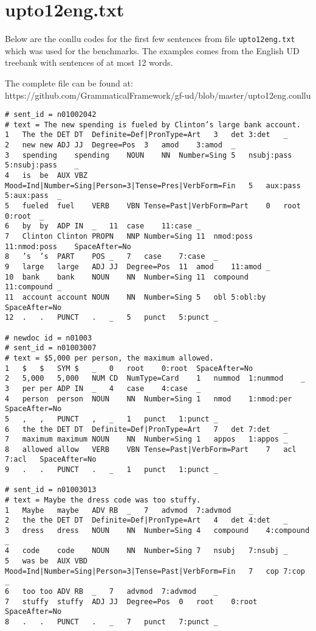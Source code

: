 \chapter{upto12eng.txt}\label{app:upto12}

Below are the conllu codes for the first few sentences from file \verb|upto12eng.txt| which was used for the benchmarks. The examples comes from the English UD treebank with sentences of at most 12 words.

The complete file can be found at: https://github.com/GrammaticalFramework/gf-ud/blob/master/upto12eng.conllu

\begin{verbatim}
# sent_id = n01002042
# text = The new spending is fueled by Clinton’s large bank account.
1	The	the	DET	DT	Definite=Def|PronType=Art	3	det	3:det	_
2	new	new	ADJ	JJ	Degree=Pos	3	amod	3:amod	_
3	spending	spending	NOUN	NN	Number=Sing	5	nsubj:pass	5:nsubj:pass	_
4	is	be	AUX	VBZ	Mood=Ind|Number=Sing|Person=3|Tense=Pres|VerbForm=Fin	5	aux:pass	5:aux:pass	_
5	fueled	fuel	VERB	VBN	Tense=Past|VerbForm=Part	0	root	0:root	_
6	by	by	ADP	IN	_	11	case	11:case	_
7	Clinton	Clinton	PROPN	NNP	Number=Sing	11	nmod:poss	11:nmod:poss	SpaceAfter=No
8	’s	’s	PART	POS	_	7	case	7:case	_
9	large	large	ADJ	JJ	Degree=Pos	11	amod	11:amod	_
10	bank	bank	NOUN	NN	Number=Sing	11	compound	11:compound	_
11	account	account	NOUN	NN	Number=Sing	5	obl	5:obl:by	SpaceAfter=No
12	.	.	PUNCT	.	_	5	punct	5:punct	_

# newdoc id = n01003
# sent_id = n01003007
# text = $5,000 per person, the maximum allowed.
1	$	$	SYM	$	_	0	root	0:root	SpaceAfter=No
2	5,000	5,000	NUM	CD	NumType=Card	1	nummod	1:nummod	_
3	per	per	ADP	IN	_	4	case	4:case	_
4	person	person	NOUN	NN	Number=Sing	1	nmod	1:nmod:per	SpaceAfter=No
5	,	,	PUNCT	,	_	1	punct	1:punct	_
6	the	the	DET	DT	Definite=Def|PronType=Art	7	det	7:det	_
7	maximum	maximum	NOUN	NN	Number=Sing	1	appos	1:appos	_
8	allowed	allow	VERB	VBN	Tense=Past|VerbForm=Part	7	acl	7:acl	SpaceAfter=No
9	.	.	PUNCT	.	_	1	punct	1:punct	_

# sent_id = n01003013
# text = Maybe the dress code was too stuffy.
1	Maybe	maybe	ADV	RB	_	7	advmod	7:advmod	_
2	the	the	DET	DT	Definite=Def|PronType=Art	4	det	4:det	_
3	dress	dress	NOUN	NN	Number=Sing	4	compound	4:compound	_
4	code	code	NOUN	NN	Number=Sing	7	nsubj	7:nsubj	_
5	was	be	AUX	VBD	Mood=Ind|Number=Sing|Person=3|Tense=Past|VerbForm=Fin	7	cop	7:cop	_
6	too	too	ADV	RB	_	7	advmod	7:advmod	_
7	stuffy	stuffy	ADJ	JJ	Degree=Pos	0	root	0:root	SpaceAfter=No
8	.	.	PUNCT	.	_	7	punct	7:punct	_

\end{verbatim}
